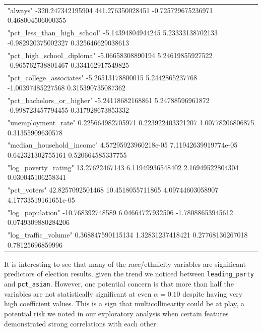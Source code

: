 \documentclass[
]{article}
\begin{document}
\begin{table}
\begin{tabular}[t]{l}
"always" -320.247342195904 441.276350028451 -0.725729675236971 0.468004506000355\\
"pct\_less\_than\_high\_school" -5.14394804944245 5.23333138702133 -0.982920375002327 0.325646629038613\\
"pct\_high\_school\_diploma" -5.06658308890194 5.24619855927522 -0.965762738801467 0.334162917549825\\
"pct\_college\_associates" -5.26513178800015 5.2442865237768 -1.00397485227568 0.315390735087362\\
\addlinespace
"pct\_bachelors\_or\_higher" -5.24118682168861 5.24788596961872 -0.998723457794455 0.317928673853332\\
"unemployment\_rate" 0.225664982705971 0.223922403321207 1.00778206806875 0.31355909630578\\
"median\_household\_income" 4.57295923960218e-05 7.11942639919774e-05 0.642321302755161 0.520664585337755\\
"log\_poverty\_rating" 13.27622467143 6.11949936548402 2.16949522804304 0.030045106258341\\
"pct\_voters" 42.8257092501468 10.4518055711865 4.09744603058907 4.17733519161651e-05\\
\addlinespace
"log\_population" -10.768392748589 6.04664727932506 -1.78088653945612 0.0749309880284206\\
"log\_traffic\_volume" 0.368847590115134 1.32831237418421 0.27768136267018 0.78125696859996\\
\bottomrule
\end{tabular}
\end{table}

It is interesting to see that many of the race/ethnicity variables are significant predictors of election results, given the trend we noticed between \texttt{leading\_party} and \texttt{pct\_asian}. However, one potential concern is that more than half the variables are not statistically significant at even \(\alpha = 0.10\) despite having very high coefficient values. This is a sign that multicollinearity could be at play, a potential risk we noted in our exploratory analysis when certain features demonstrated strong correlations with each other.
\end{document}
